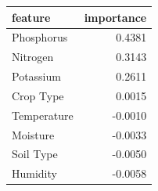\begin{tabular}{lr}
\toprule
feature & importance \\
\midrule
Phosphorus & 0.4381 \\
Nitrogen & 0.3143 \\
Potassium & 0.2611 \\
Crop Type & 0.0015 \\
Temperature & -0.0010 \\
Moisture & -0.0033 \\
Soil Type & -0.0050 \\
Humidity & -0.0058 \\
\bottomrule
\end{tabular}
